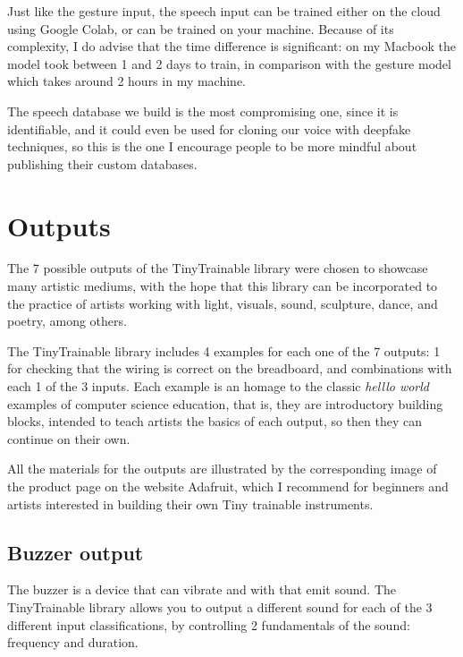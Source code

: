 Just like the gesture input, the speech input can be trained either on the cloud using Google Colab, or can be trained on your machine. Because of its complexity, I do advise that the time difference is significant: on my Macbook the model took between 1 and 2 days to train, in comparison with the gesture model which takes around 2 hours in my machine.

The speech database we build is the most compromising one, since it is identifiable, and it could even be used for cloning our voice with deepfake techniques, so this is the one I encourage people to be more mindful about publishing their custom databases.

\section{Outputs}

The 7 possible outputs of the TinyTrainable library were chosen to showcase many artistic mediums, with the hope that this library can be incorporated to the practice of artists working with light, visuals, sound, sculpture, dance, and poetry, among others.

The TinyTrainable library includes 4 examples for each one of the 7 outputs: 1 for checking that the wiring is correct on the breadboard, and combinations with each 1 of the 3 inputs. Each example is an homage to the classic \emph{helllo world} examples of computer science education, that is, they are introductory building blocks, intended to teach artists the basics of each output, so then they can continue on their own.

All the materials for the outputs are illustrated by the corresponding image of the product page on the website Adafruit, which I recommend for beginners and artists interested in building their own Tiny trainable instruments.

\subsection{Buzzer output}

The buzzer is a device that can vibrate and with that emit sound. The TinyTrainable library allows you to output a different sound for each of the 3 different input classifications, by controlling 2 fundamentals of the sound: frequency and duration.

